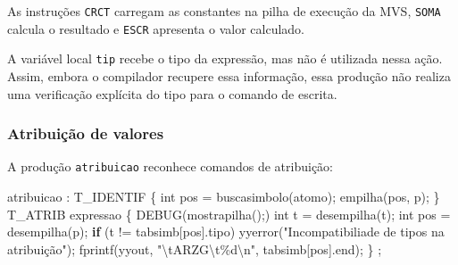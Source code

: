 \documentclass[
  brazilian,
  letterpaper,
]{book}
\newenvironment{Shaded}{\begin{snugshade}}{\end{snugshade}}
\newcommand{\CharTok}[1]{\textcolor[rgb]{0.13,0.47,0.30}{#1}}
\newcommand{\ControlFlowTok}[1]{\textcolor[rgb]{0.00,0.23,0.31}{\textbf{#1}}}
\newcommand{\DataTypeTok}[1]{\textcolor[rgb]{0.68,0.00,0.00}{#1}}
\newcommand{\NormalTok}[1]{\textcolor[rgb]{0.00,0.23,0.31}{#1}}
\newcommand{\OperatorTok}[1]{\textcolor[rgb]{0.37,0.37,0.37}{#1}}
\newcommand{\SpecialCharTok}[1]{\textcolor[rgb]{0.37,0.37,0.37}{#1}}
\newcommand{\StringTok}[1]{\textcolor[rgb]{0.13,0.47,0.30}{#1}}
\theoremstyle{plain}
\theoremstyle{definition}
\theoremstyle{remark}
\begin{document}
As instruções \texttt{CRCT} carregam as constantes na pilha de execução
da MVS, \texttt{SOMA} calcula o resultado e \texttt{ESCR} apresenta o
valor calculado.

A variável local \texttt{tip} recebe o tipo da expressão, mas não é
utilizada nessa ação. Assim, embora o compilador recupere essa
informação, essa produção não realiza uma verificação explícita do tipo
para o comando de escrita.

\subsubsection{Atribuição de valores}\label{atribuiuxe7uxe3o-de-valores}

A produção \texttt{atribuicao} reconhece comandos de atribuição:

\begin{Shaded}
\begin{Highlighting}[]
\NormalTok{atribuicao}
    \OperatorTok{:}\NormalTok{ T\_IDENTIF}
        \OperatorTok{\{} 
            \DataTypeTok{int}\NormalTok{ pos }\OperatorTok{=}\NormalTok{ buscasimbolo}\OperatorTok{(}\NormalTok{atomo}\OperatorTok{);}
\NormalTok{            empilha}\OperatorTok{(}\NormalTok{pos}\OperatorTok{,} \CharTok{\textquotesingle{}p\textquotesingle{}}\OperatorTok{);}
        \OperatorTok{\}} 
\NormalTok{      T\_ATRIB expressao}
        \OperatorTok{\{}
\NormalTok{            DEBUG}\OperatorTok{(}\NormalTok{mostrapilha}\OperatorTok{();)}
            \DataTypeTok{int}\NormalTok{ t }\OperatorTok{=}\NormalTok{ desempilha}\OperatorTok{(}\CharTok{\textquotesingle{}t\textquotesingle{}}\OperatorTok{);}
            \DataTypeTok{int}\NormalTok{ pos }\OperatorTok{=}\NormalTok{ desempilha}\OperatorTok{(}\CharTok{\textquotesingle{}p\textquotesingle{}}\OperatorTok{);} 
            \ControlFlowTok{if} \OperatorTok{(}\NormalTok{t }\OperatorTok{!=}\NormalTok{ tabsimb}\OperatorTok{[}\NormalTok{pos}\OperatorTok{].}\NormalTok{tipo}\OperatorTok{)} 
\NormalTok{                yyerror}\OperatorTok{(}\StringTok{"Incompatibiliade de tipos na atribuição"}\OperatorTok{);}
\NormalTok{            fprintf}\OperatorTok{(}\NormalTok{yyout}\OperatorTok{,} \StringTok{"}\SpecialCharTok{\textbackslash{}t}\StringTok{ARZG}\SpecialCharTok{\textbackslash{}t\%d\textbackslash{}n}\StringTok{"}\OperatorTok{,}\NormalTok{ tabsimb}\OperatorTok{[}\NormalTok{pos}\OperatorTok{].}\NormalTok{end}\OperatorTok{);} 
        \OperatorTok{\}}
    \OperatorTok{;}
\end{Highlighting}
\end{Shaded}
\end{document}
